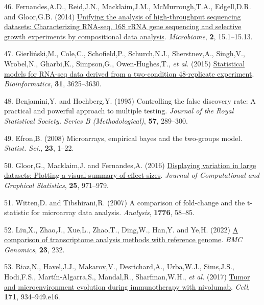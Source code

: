 \documentclass[
]{article}
\newlength{\cslhangindent}
\newenvironment{CSLReferences}[2] %
 {\begin{list}{}{%
  \setlength{\itemindent}{0pt}
  \setlength{\leftmargin}{0pt}
  \setlength{\parsep}{0pt}
  \ifodd #1
   \setlength{\leftmargin}{\cslhangindent}
   \setlength{\itemindent}{-1\cslhangindent}
  \fi
  \setlength{\itemsep}{#2\baselineskip}}}
 {\end{list}}
\begin{document}
\begin{CSLReferences}{1}{1}
46. Fernandes,A.D., Reid,J.N., Macklaim,J.M., McMurrough,T.A.,
Edgell,D.R. and Gloor,G.B. (2014)
\href{https://doi.org/10.1186/2049-2618-2-15}{Unifying the analysis of
high-throughput sequencing datasets: Characterizing {RNA}-seq, 16{S}
r{RNA} gene sequencing and selective growth experiments by compositional
data analysis}. \emph{Microbiome}, \textbf{2}, 15.1--15.13.

47. Gierliński,M., Cole,C., Schofield,P., Schurch,N.J., Sherstnev,A.,
Singh,V., Wrobel,N., Gharbi,K., Simpson,G., Owen-Hughes,T., \emph{et
al.} (2015)
\href{https://doi.org/10.1093/bioinformatics/btv425}{Statistical models
for RNA-seq data derived from a two-condition 48-replicate experiment}.
\emph{Bioinformatics}, \textbf{31}, 3625--3630.

48. Benjamini,Y. and Hochberg,Y. (1995) Controlling the false discovery
rate: A practical and powerful approach to multiple testing.
\emph{Journal of the Royal Statistical Society. Series B
(Methodological)}, \textbf{57}, 289--300.

49. Efron,B. (2008) Microarrays, empirical bayes and the two-groups
model. \emph{Statist. Sci.}, \textbf{23}, 1--22.

50. Gloor,G., Macklaim,J. and Fernandes,A. (2016)
\href{https://doi.org/10.1080/10618600.2015.1131161}{Displaying
variation in large datasets: Plotting a visual summary of effect sizes}.
\emph{Journal of Computational and Graphical Statistics}, \textbf{25},
971--979.

51. Witten,D. and Tibshirani,R. (2007) A comparison of fold-change and
the t-statistic for microarray data analysis. \emph{Analysis},
\textbf{1776}, 58--85.

52. Liu,X., Zhao,J., Xue,L., Zhao,T., Ding,W., Han,Y. and Ye,H. (2022)
\href{https://doi.org/10.1186/s12864-022-08465-0}{A comparison of
transcriptome analysis methods with reference genome}. \emph{BMC
Genomics}, \textbf{23}, 232.

53. Riaz,N., Havel,J.J., Makarov,V., Desrichard,A., Urba,W.J.,
Sims,J.S., Hodi,F.S., Martín-Algarra,S., Mandal,R., Sharfman,W.H.,
\emph{et al.} (2017)
\href{https://doi.org/10.1016/j.cell.2017.09.028}{Tumor and
microenvironment evolution during immunotherapy with nivolumab}.
\emph{Cell}, \textbf{171}, 934--949.e16.


\end{CSLReferences}
\end{document}
